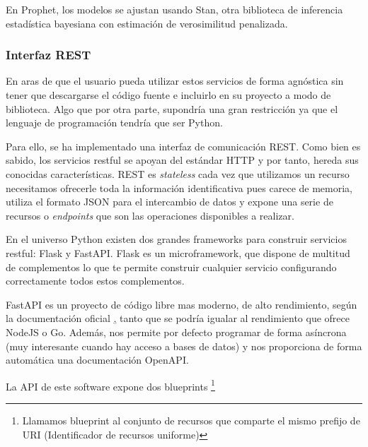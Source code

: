 En Prophet, los modelos se ajustan usando Stan, otra biblioteca de inferencia estadística
bayesiana con estimación de verosimilitud penalizada.

\subsubsection{Interfaz REST}
En aras de que el usuario pueda utilizar estos servicios de forma agnóstica sin tener que
descargarse el código fuente e incluirlo en su proyecto a modo de biblioteca. Algo que por
otra parte, supondría una gran restricción ya que el lenguaje de programación tendría que
ser Python.

Para ello, se ha implementado una interfaz de comunicación REST. Como bien es sabido, los
servicios restful se apoyan del estándar HTTP y por tanto, hereda sus conocidas
características. REST es \textit{stateless} cada vez que utilizamos un recurso necesitamos
ofrecerle toda la información identificativa pues carece de memoria, utiliza el formato
JSON para el intercambio de datos y expone una serie de recursos o \textit{endpoints} que
son las operaciones disponibles a realizar.

En el universo Python existen dos grandes frameworks para construir servicios restful:
Flask y FastAPI. Flask es un microframework, que dispone de multitud de complementos lo
que te permite construir cualquier servicio configurando correctamente todos estos
complementos. 

FastAPI es un proyecto de código libre mas moderno, de alto rendimiento, según la
documentación oficial \href{https://fastapi.tiangolo.com}, tanto que se podría igualar al
rendimiento que ofrece NodeJS o Go. Además, nos permite por defecto programar de forma
asíncrona (muy interesante cuando hay acceso a bases de datos) y nos proporciona de forma
automática una documentación OpenAPI.

La API de este software expone dos blueprints \footnote{Llamamos blueprint al conjunto de
recursos que comparte el mismo prefijo de URI (Identificador de recursos uniforme)}

